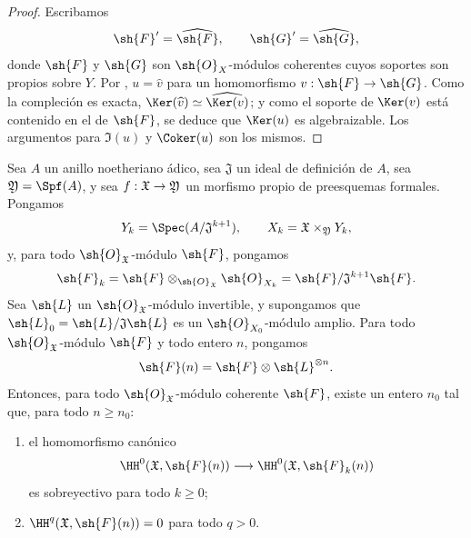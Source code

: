 \documentclass[oneside]{amsart}
\makeatletter
\renewcommand{\geq}{\geqslant}
\newcommand{\ega@arrow}[2]{\mathchoice{#1}{#2}{#2}{#2}}
\renewcommand{\to}{\ega@arrow{\longrightarrow}{\rightarrow}}
\let\EGAOriginalLabel\label
\renewcommand{\label}[1]{\phantomsection\EGAOriginalLabel{#1}}
\makeatother
\begin{document}
\begin{proof}
Escribamos
\[
  \sh{F}'=\widehat{\sh{F}},\qquad
  \sh{G}'=\widehat{\sh{G}},
\]
donde $\sh{F}$ y $\sh{G}$ son $\sh{O}_X$-módulos coherentes cuyos
soportes son propios sobre $Y$. Por ,
$u=\widehat{v}$ para un homomorfismo
$v:\sh{F}\to\sh{G}$. Como la compleción es exacta,
$\Ker(\widehat{v})\simeq\widehat{\Ker(v)}$; y como el soporte
de $\Ker(v)$ está contenido en el de $\sh{F}$, se deduce que
$\Ker(u)$ es algebraizable. Los argumentos para $\Im(u)$ y
$\Coker(u)$ son los mismos.
\end{proof}

\begin{proposition}[5.2.3]
\label{III.5.2.3}
Sea $A$ un anillo noetheriano ádico, sea $\mathfrak{J}$ un ideal de
definición de $A$, sea $\mathfrak{Y}=\Spf(A)$, y sea
$f:\mathfrak{X}\to\mathfrak{Y}$ un morfismo propio de preesquemas
formales. Pongamos
\[
  Y_k=\Spec(A/\mathfrak{J}^{k+1}),\qquad
  X_k=\mathfrak{X}\times_{\mathfrak{Y}}Y_k,
\]
y, para todo $\sh{O}_{\mathfrak{X}}$-módulo $\sh{F}$, pongamos
\[
  \sh{F}_k
  =
  \sh{F}\otimes_{\sh{O}_{\mathfrak{X}}}\sh{O}_{X_k}
  =
  \sh{F}/\mathfrak{J}^{k+1}\sh{F}.
\]
Sea $\sh{L}$ un $\sh{O}_{\mathfrak{X}}$-módulo invertible, y
supongamos que
$\sh{L}_0=\sh{L}/\mathfrak{J}\sh{L}$ es un
$\sh{O}_{X_0}$-módulo amplio. Para todo
$\sh{O}_{\mathfrak{X}}$-módulo $\sh{F}$ y todo entero $n$, pongamos
\[
  \sh{F}(n)=\sh{F}\otimes\sh{L}^{\otimes n}.
\]
Entonces, para todo $\sh{O}_{\mathfrak{X}}$-módulo coherente $\sh{F}$,
existe un entero $n_0$ tal que, para todo $n\geq n_0$:
\begin{enumerate}
  \item[\rm{(i)}] el homomorfismo canónico
    \[
      \HH^0(\mathfrak{X},\sh{F}(n))
      \longrightarrow
      \HH^0(\mathfrak{X},\sh{F}_k(n))
    \]
    es sobreyectivo para todo $k\geq0$;
  \item[\rm{(ii)}]
    $\HH^q(\mathfrak{X},\sh{F}(n))=0$ para todo $q>0$.
\end{enumerate}
\end{proposition}
\end{document}
